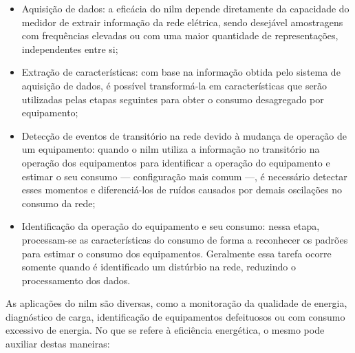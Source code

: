 \begin{itemize}
\item Aquisição de dados: a eficácia do \acs{nilm} depende diretamente
da capacidade do medidor de extrair informação da rede elétrica, sendo
desejável amostragens com frequências elevadas ou com uma maior
quantidade de representações, independentes entre si;
\item Extração de características: com base na informação obtida pelo
sistema de aquisição de dados, é possível transformá-la em
características que serão utilizadas pelas etapas seguintes para obter
o consumo desagregado por equipamento;
\item Detecção de eventos de transitório na rede devido à mudança de
operação de um equipamento: quando o \acs{nilm} utiliza a informação no
transitório na operação dos equipamentos para identificar a operação do
equipamento e estimar o seu consumo --- configuração mais comum ---, é
necessário detectar esses momentos e diferenciá-los de
ruídos causados por demais oscilações no consumo da rede;
\item Identificação da operação do equipamento e seu consumo:
nessa etapa, processam-se as características do consumo de forma a
reconhecer os padrões para estimar o consumo dos
equipamentos. Geralmente essa tarefa ocorre somente quando é
identificado um distúrbio na rede, reduzindo o processamento dos
dados.
\end{itemize}

As aplicações do \acs{nilm} são diversas, como a monitoração da
qualidade de energia, diagnóstico de carga, identificação de equipamentos
defeituosos ou com consumo excessivo de energia. No que se refere à
eficiência energética, o mesmo pode auxiliar destas maneiras:

